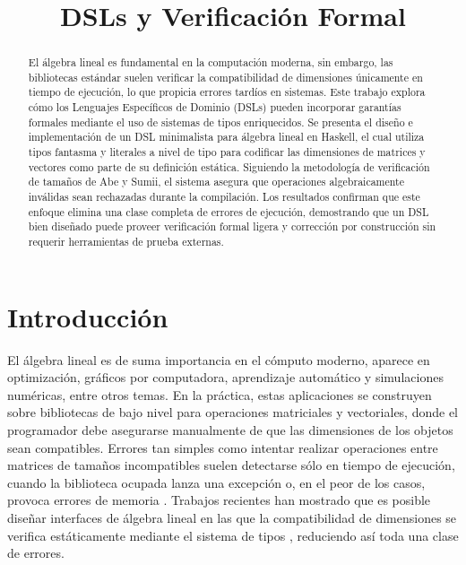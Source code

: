 \documentclass[conference]{IEEEtran}
\title{DSLs y Verificación Formal}
\author{
    \IEEEauthorblockN{Vázquez Dávila José Adolfo \qquad\qquad Cruz Pineda Fernando}
    \IEEEauthorblockA{\textit{Universidad Nacional Autónoma de México}\\
    \textit{Facultad de Ciencias} 
    }
    \IEEEauthorblockA{jose.a\_vazquezd@ciencias.unam.mx \qquad\qquad cruzfernando@ciencias.unam.mx}
}
\begin{document}
\maketitle
\thispagestyle{plain}
\pagestyle{plain}

\begin{abstract}
El álgebra lineal es fundamental en la computación moderna, sin embargo, las bibliotecas estándar suelen verificar la compatibilidad de dimensiones únicamente en tiempo de ejecución, lo que propicia errores tardíos en sistemas. Este trabajo explora cómo los Lenguajes Específicos de Dominio (DSLs) pueden incorporar garantías formales mediante el uso de sistemas de tipos enriquecidos. Se presenta el diseño e implementación de un DSL minimalista para álgebra lineal en Haskell, el cual utiliza tipos fantasma y literales a nivel de tipo para codificar las dimensiones de matrices y vectores como parte de su definición estática. Siguiendo la metodología de verificación de tamaños de Abe y Sumii, el sistema asegura que operaciones algebraicamente inválidas sean rechazadas durante la compilación. Los resultados confirman que este enfoque elimina una clase completa de errores de ejecución, demostrando que un DSL bien diseñado puede proveer verificación formal ligera y corrección por construcción sin requerir herramientas de prueba externas.
\end{abstract}

\section{Introducción}

El álgebra lineal es de suma importancia en el cómputo moderno, aparece en optimización, gráficos por computadora, aprendizaje automático y simulaciones numéricas, entre otros temas. En la práctica, estas aplicaciones se construyen sobre bibliotecas de bajo nivel para operaciones matriciales y vectoriales, donde el programador debe asegurarse manualmente de que las dimensiones de los objetos sean compatibles. Errores tan simples como intentar realizar operaciones entre matrices de tamaños incompatibles suelen detectarse sólo en tiempo de ejecución, cuando la biblioteca ocupada lanza una excepción o, en el peor de los casos, provoca errores de memoria \cite{abe2015}. Trabajos recientes han mostrado que es posible diseñar interfaces de álgebra lineal en las que la compatibilidad de dimensiones se verifica estáticamente mediante el sistema de tipos \cite{abe2015}, reduciendo así toda una clase de errores.
\end{document}
